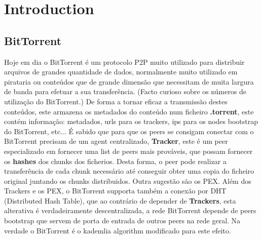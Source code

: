 \chapter{Introduction}
\label{Introduction}

\section{BitTorrent}
\label{BitTorrent}

Hoje em dia o BitTorrent é um protocolo P2P muito utilizado para distribuir arquivos de grandes quantidade de dados, normalmente muito utilizado em pirataria ou conteúdos que de grande dimensão que necessitam de muita largura de banda para efetuar a sua transferência. (Facto curioso sobre os números de utilização do BitTorrent.)
De forma a tornar eficaz a transmissão destes conteúdos, este armazena os metadados do conteúdo num ficheiro \textbf{.torrent}, este contém informação: metadados, urls para os trackers, ips para os nodes bootstrap do BitTorrent, etc...
É sabido que para que os peers se consigam conectar com o BitTorrent precisam de um agent centralizado, \textbf{Tracker}, este é um peer especializado em fornecer uma list de peers mais prováveis, que possam fornecer os \textbf{hashes} dos chunks dos ficherios. Desta forma, o peer pode realizar a transferência de cada chunk necessário até conseguir obter uma copia do ficheiro original juntando os chunks distribuidos.
Outra sugestão são os PEX.
Além dos Trackers e os PEX, o BitTorrent supporta também a conexão por DHT (Distributed Hash Table), que ao contrário de depender de \textbf{Trackers}, esta alterativa é verdadeiramente descentralizada, a rede BitTorrent depende de peers bootstrap que servem de porta de entrada de outros peers na rede geral. Na verdade o BitTorrent é o kademlia algorithm modificado para este efeito.
